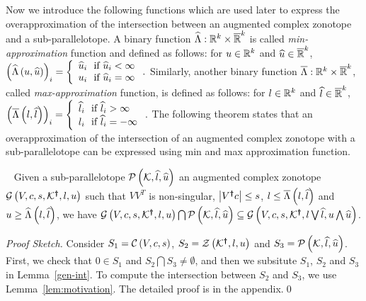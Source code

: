 Now we introduce the following functions which are used later to
express the overapproximation of the intersection between an augmented
complex zonotope and a sub-parallelotope.
%
A binary function
$\widehat{\Lambda}:\mathbb{R}^k\times\mathbb{\overline{R}}^k$ is
called \emph{min-approximation} function and defined as follows: for
$u\in\mathbb{R}^k$ and $\widehat{u}\in\mathbb{\overline{R}}^k$,
$\left(\widehat{\Lambda}\left(u,\widehat{u}\right)\right)_i = \left\{
\begin{array}{l}
\widehat{u}_i~~\text{if}~\widehat{u}_i<\infty\\
u_i~~\text{if}~\widehat{u}_i=\infty
\end{array}
\right..$
Similarly, another binary function       
$\overline{\Lambda}:\mathbb{R}^k\times\mathbb{\overline{R}}^k$,
called \emph{max-approximation} function, is defined as follows: for
$l\in\mathbb{R}^k$ and $\widehat{l}\in\mathbb{\overline{R}}^k$,
$\left(\overline{\Lambda}\left(l,\widehat{l}\right)\right)_i = \left\{
\begin{array}{l}
\widehat{l}_i~~\text{if}~\widehat{l}_i>\infty\\
l_i~~\text{if}~\widehat{l}_i=-\infty
\end{array}
\right..$
%
The following theorem states that an overapproximation of the intersection
of an augmented complex zonotope with a sub-parallelotope can be
expressed using min and max approximation function.
\begin{theorem}~\label{thm:acz-int}
Given a sub-parallelotope $\mathcal{P}\left(\mathcal{K},\widehat{l},\widehat{u}\right)$ an
augmented complex zonotope $\mathcal{G}\left(V,c,s,\mathcal{K}^{\bm{\dagger}},l,u\right)$
such that $VV^T$ is non-singular, $\left|V^{\bm{\dagger}}c\right|\leq s$, $l\leq
\overline{\Lambda}\left(l,\widehat{l}\right)$ and $u\geq \widehat{\Lambda}\left(l,\widehat{l}\right)$, we have
$\mathcal{G}\left(V,c,s,\mathcal{K}^{\bm{\dagger}},l,u\right)\bigcap\mathcal{P}\left(\mathcal{K},\widehat{l},\widehat{u}\right)\subseteq
\mathcal{G}\left(V,c,s,\mathcal{K}^{\bm{\dagger}},l\bigvee\widehat{l},u\bigwedge\widehat{u}\right)$.
\end{theorem}
\emph{Proof Sketch.}  Consider $S_1 = \mathcal{C}\left(V,c,s\right)$, $S_2 =
\mathcal{Z}\left(\mathcal{K}^{\bm{\dagger}},l,u\right)$ and $S_3 =
\mathcal{P}\left(\mathcal{K},\widehat{l},\widehat{u}\right)$.  First, we check that $0\in S_1$
and $S_2\bigcap S_3\neq \emptyset$, and then we subsitute $S_1$, $S_2$
and $S_3$ in Lemma~\ref{gen-int}.  To compute the intersection
between $S_2$ and $S_3$, we use Lemma~\ref{lem:motivation}.  The
detailed proof is in the appendix.\qed


